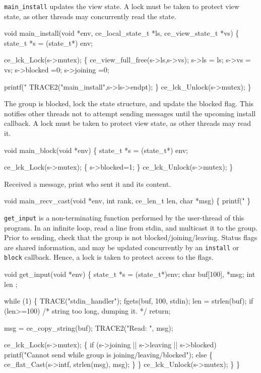 {\tt main\_install} updates the view state. A lock must be taken to
protect view state, as other threads may concurrently read the state.
\begin{codebox}
void
main_install(void *env, ce_local_state_t *ls, ce_view_state_t *vs)
\{
    state_t *s = (state_t*) env;
    
    ce_lck_Lock(s->mutex); \{
        ce_view_full_free(s->ls,s->vs);
        s->ls = ls;
        s->vs = vs;
        s->blocked =0;
        s->joining =0;
	
        printf("%
        TRACE2("main_install",s->ls->endpt); 
    \} ce_lck_Unlock(s->mutex);
\}
\end{codebox}


The group is blocked, lock the state structure, and update the blocked
flag. This notifies other threads not to attempt sending messages
until the upcoming install callback. A lock must be taken to protect view
state, as other threads may read it.
\begin{codebox}
void
main_block(void *env)
\{
    state_t *s = (state_t*) env;
    
    ce_lck_Lock(s->mutex); \{
        s->blocked=1;
   \} ce_lck_Unlock(s->mutex);
\}
\end{codebox}

Received a message, print who sent it and its content.
\begin{codebox}
void
main_recv_cast(void *env, int rank, ce_len_t len, char *msg)
\{
    printf("%
\}
\end{codebox}

{\tt get\_input} is a non-terminating function performed by the user-thread of
this program. In an infinite loop, read a line from stdin, 
and multicast it to the group. Prior to sending, check that the group is not
blocked/joining/leaving. Status flags are shared information, and
may be updated concurrently by an {\tt install} or {\tt block}
callback. Hence, a lock is taken to protect access to the flags.
\begin{codebox}
void
get_input(void *env)
\{
    state_t *s = (state_t*)env;
    char buf[100], *msg;
    int len ;

    while (1) \{
        TRACE("stdin_handler");
        fgets(buf, 100, stdin);
        len = strlen(buf);
        if (len>=100)
            /* string too long, dumping it.
             */
            return;
        	
        msg = ce_copy_string(buf);
        TRACE2("Read: ", msg);
	
        ce_lck_Lock(s->mutex); \{
            if (s->joining || s->leaving || s->blocked)
               	printf("Cannot send while group is joining/leaving/blocked");
            else \{
               	ce_flat_Cast(s->intf, strlen(msg), msg);
            \}
        \} ce_lck_Unlock(s->mutex);
    \}
\}
\end{codebox}



